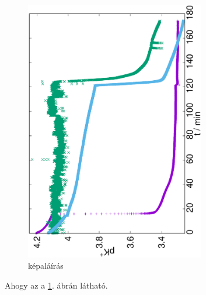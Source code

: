 \begin{figure}
\centering
\includegraphics[width=0.7\textwidth, angle=-90]{img/meres.eps}
\caption{képaláírás}
\label{fig:mérések}
\end{figure}

Ahogy az a \ref{fig:mérések}. ábrán látható.


